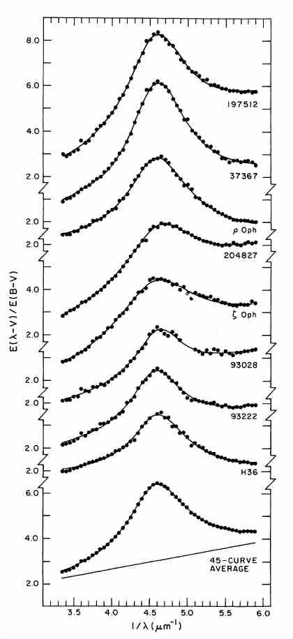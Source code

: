 \begin{frame}
\begin{minipage}[t]{0.4\textwidth}
\begin{center}
    \includegraphics[width=\textwidth,height=!]{./D/uvbump_drude.jpg}
    \end{center}
\end{minipage}


\end{frame}
